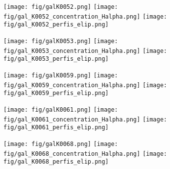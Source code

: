 \begin{figure}[!ht]
\begin{center}
\setcaptionmargin{1cm}
\texttt{[image: fig/galK0052.png]}
\texttt{[image: fig/gal\_K0052\_concentration\_Halpha.png]}
\texttt{[image: fig/gal\_K0052\_perfis\_elip.png]}
\end{center}
\end{figure}


\begin{figure}[!ht]
\begin{center}
\setcaptionmargin{1cm}
\texttt{[image: fig/galK0053.png]}
\texttt{[image: fig/gal\_K0053\_concentration\_Halpha.png]}
\texttt{[image: fig/gal\_K0053\_perfis\_elip.png]}
\end{center}
\end{figure}

\begin{figure}[!ht]
\begin{center}
\setcaptionmargin{1cm}
\texttt{[image: fig/galK0059.png]}
\texttt{[image: fig/gal\_K0059\_concentration\_Halpha.png]}
\texttt{[image: fig/gal\_K0059\_perfis\_elip.png]}
\end{center}
\end{figure}


\begin{figure}[!ht]
\begin{center}
\setcaptionmargin{1cm}
\texttt{[image: fig/galK0061.png]}
\texttt{[image: fig/gal\_K0061\_concentration\_Halpha.png]}
\texttt{[image: fig/gal\_K0061\_perfis\_elip.png]}
\end{center}
\end{figure}


\begin{figure}[!ht]
\begin{center}
\setcaptionmargin{1cm}
\texttt{[image: fig/galK0068.png]}
\texttt{[image: fig/gal\_K0068\_concentration\_Halpha.png]}
\texttt{[image: fig/gal\_K0068\_perfis\_elip.png]}
\end{center}
\end{figure}


